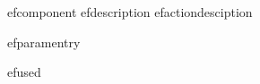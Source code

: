 \jb{}efcomponent{}
\jb{}efdescription{}
\jb{}efactiondesciption{}{}
\begin{gdrefparam}
  \jb{}efparamentry{}{}{}{}
\end{gdrefparam}
\jb{}efused{}

